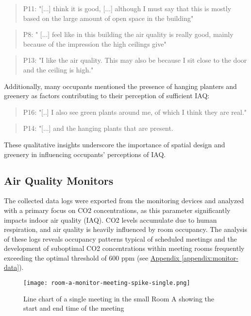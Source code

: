 \begin{quote}
P11: "[...] think it is good, [...] although I must say that this is mostly based on the large amount of open space in the building"
\end{quote}

\begin{quote}
P8: " [...] feel like in this building the air quality is really good, mainly because of the impression the high ceilings give"
\end{quote}

\begin{quote}
P13: "I like the air quality. This may also be because I sit close to the door and the ceiling is high."
\end{quote}

Additionally, many occupants mentioned the presence of hanging planters and greenery as factors contributing to their perception of sufficient IAQ:

\begin{quote}
P16: "[..] I also see green plants around me, of which I think they are real."
\end{quote}

\begin{quote}
P14: "[...] and the hanging plants that are present.
\end{quote}

These qualitative insights underscore the importance of spatial design and greenery in influencing occupants' perceptions of IAQ.

\subsection{Air Quality Monitors}
\label{sec:monitor_analysis}

The collected data logs were exported from the monitoring devices and analyzed with a primary focus on CO2 concentrations, as this parameter significantly impacts indoor air quality (IAQ). CO2 levels accumulate due to human respiration, and air quality is heavily influenced by room occupancy. The analysis of these logs reveals occupancy patterns typical of scheduled meetings and the development of suboptimal CO2 concentrations within meeting rooms frequently exceeding the optimal threshold of 600 ppm (see \hyperref[appendix:monitor-data]{Appendix \ref*{appendix:monitor-data}}).

\begin{figure}[h]
    \centering
    \texttt{[image: room-a-monitor-meeting-spike-single.png]}
    \caption{Line chart of a single meeting in the small Room A showing the start and end time of the meeting}
    \label{fig:room-a-spike}
\end{figure}

